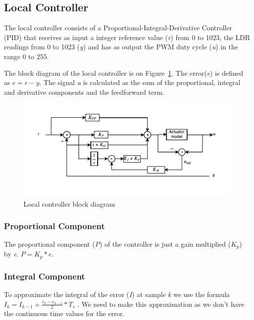 \subsection{Local Controller}
\label{sec:LocalController}

The local controller consists of a Proportional-Integral-Derivative Controller (PID) that receives as input a integer reference value (\emph{r}) from 0 to 1023, the LDR readings from 0 to 1023 (\emph{y}) and has as output the PWM duty cycle (\emph{u}) in the range 0 to 255.

The block diagram of the local controller is on Figure~\ref{fig:pid_block_diagram}. The error(\emph{e}) is defined as $e = r - y$. The signal \emph{u} is calculated as the sum of the proportional, integral and derivative components and the feedforward term.

\begin{figure}[!ht]
    \centering
        \includegraphics[scale=0.8]{img/pid_block_diagram}
    \caption{Local controller block diagram}\label{fig:pid_block_diagram}
\end{figure}


\subsubsection{Proportional Component}
\label{sub:ProportionalComponent}

The proportional component (\emph{P}) of the controller is just a gain multiplied (\emph{$K_p$}) by \emph{e}. $ P = K_p * e$.

\subsubsection{Integral Component}
\label{sub:IntegralComponent}

To approximate the integral of the error (\emph{I}) at sample \emph{k} we use the formula $ I_k = I_{k-1} + \frac{e_k-e_{k-1}}{2} * T_s$ .
We need to make this approximation as we don't have the continuous time values for the error.

